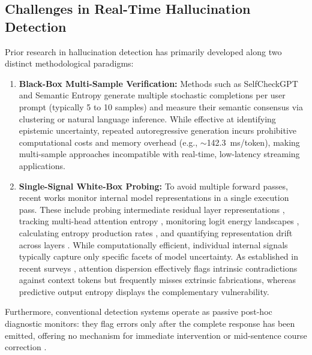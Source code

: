 \documentclass[journal]{IEEEtran}
\begin{document}
\subsection{Challenges in Real-Time Hallucination Detection}
Prior research in hallucination detection has primarily developed along two distinct methodological paradigms:
\begin{enumerate}
    \item \textbf{Black-Box Multi-Sample Verification:} Methods such as SelfCheckGPT \cite{manakul2023selfcheckgpt} and Semantic Entropy \cite{han2024semantic} generate multiple stochastic completions per user prompt (typically 5 to 10 samples) and measure their semantic consensus via clustering or natural language inference. While effective at identifying epistemic uncertainty, repeated autoregressive generation incurs prohibitive computational costs and memory overhead (e.g., $\sim$142.3~ms/token), making multi-sample approaches incompatible with real-time, low-latency streaming applications.
    \item \textbf{Single-Signal White-Box Probing:} To avoid multiple forward passes, recent works monitor internal model representations in a single execution pass. These include probing intermediate residual layer representations \cite{azaria2023internal, su2024mind, zhang2025mhad}, tracking multi-head attention entropy \cite{hajji2025map, vazhentsev2025uncertainty}, monitoring logit energy landscapes \cite{ma2024semantic}, calculating entropy production rates \cite{moslonka2025epr}, and quantifying representation drift across layers \cite{dasgupta2025hallushift, nath2025hallushift}. While computationally efficient, individual internal signals typically capture only specific facets of model uncertainty. As established in recent surveys \cite{kang2025uq, jing2025faith}, attention dispersion effectively flags intrinsic contradictions against context tokens but frequently misses extrinsic fabrications, whereas predictive output entropy displays the complementary vulnerability.
\end{enumerate}

Furthermore, conventional detection systems operate as passive post-hoc diagnostic monitors: they flag errors only after the complete response has been emitted, offering no mechanism for immediate intervention or mid-sentence course correction \cite{dhuliawala2024chain}.
\end{document}
